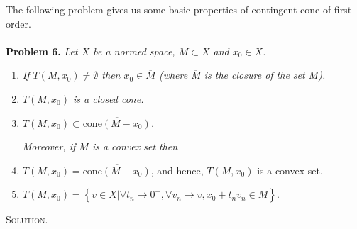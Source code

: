\documentclass[a4paper]{article}
\numberwithin{equation}{section}
\begin{document}
The following problem gives us some basic properties of contingent cone of first order.\\
\\
\textbf{Problem 6.} \textit{Let $X$ be a normed space, $M\subset X$ and $x_0 \in X$.}
\begin{enumerate}
\item \textit{If $T\left(M,x_0\right) \ne \emptyset$ then $x_0 \in \overline{M}$ (where $\overline{M}$ is the closure of the set $M$).}
\item \textit{$T\left(M,x_0\right)$ is a closed cone.}
\item \textit{$T\left( {M,{x_0}} \right) \subset \overline {\mbox{cone}\left( {M - {x_0}} \right)}$.}

\textit{Moreover, if $M$ is a convex set then}
\item $T\left( {M,{x_0}} \right) = \overline {\mbox{cone}\left( {M - {x_0}} \right)} $, and hence, $T\left(M,x_0\right)$ is a convex set.
\item $T\left( {M,{x_0}} \right) = \left\{ {v \in X|\forall {t_n} \to {0^ + },\forall {v_n} \to v,{x_0} + {t_n}{v_n} \in M} \right\}$.
\end{enumerate}
\textsc{Solution.}
\end{document}
